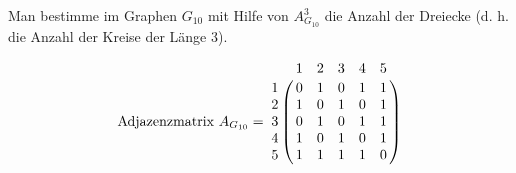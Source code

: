 \documentclass[a4paper, 12pt, margins=2cm]{homework}
\begin{document}
  \begin{problem}
    Man bestimme im Graphen $G_{10}$ mit Hilfe von $A_{G_{10}}^3$ die Anzahl der
    Dreiecke (d. h. die Anzahl der Kreise der Länge 3).
    \begin{center}
      \def\svgwidth{2.5cm}
      
    \end{center}
  \end{problem}
  \begin{solution}
    \[ \text{Adjazenzmatrix } A_{G_{10}} = \bordermatrix{
      ~ & 1 & 2 & 3 & 4 & 5 \cr
      1 & 0 & 1 & 0 & 1 & 1 \cr
      2 & 1 & 0 & 1 & 0 & 1 \cr
      3 & 0 & 1 & 0 & 1 & 1 \cr
      4 & 1 & 0 & 1 & 0 & 1 \cr
      5 & 1 & 1 & 1 & 1 & 0 
    } \]
  \end{solution}


  \begin{problem}
    
  \end{problem}
  \begin{solution}
    
  \end{solution}


  \begin{problem}
    
  \end{problem}
  \begin{solution}
    
  \end{solution}


  \begin{problem}
    
  \end{problem}
  \begin{solution}
    
  \end{solution}


  \begin{problem}

  \end{problem}
  \begin{solution}
    
  \end{solution}
\end{document}

